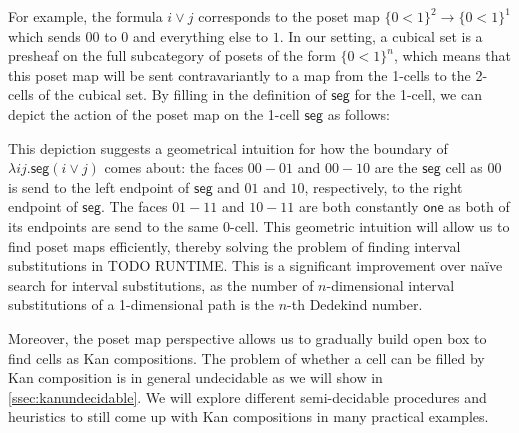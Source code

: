 \documentclass{llncs}
\newcommand{\cset}[1]{\ensuremath{\mathsf{{#1}}}}
\begin{document}
For example, the formula $i \vee j$ corresponds to the poset map $\{ 0<1 \}^2
\to \{ 0<1 \}^1$ which sends $00$ to $0$ and everything else to $1$. In our
setting, a cubical set
is a presheaf on the full subcategory of posets of the form $\{ 0<1 \}^n$, which
means that this poset map will be sent contravariantly to a map from the 1-cells
to the 2-cells of the cubical set. By filling in the definition of \cset{seg}
for the 1-cell, we can depict the action of the poset map on the 1-cell
\cset{seg} as follows:
\begin{center}
\end{center}

This depiction suggests a geometrical intuition for how the boundary of $\lambda i
j.\cset{seg} (i \vee j)$ comes about: the faces $00-01$ and $00-10$ are the
\cset{seg} cell as $00$ is send to the left endpoint of \cset{seg} and $01$ and
$10$, respectively, to the right endpoint of \cset{seg}. The faces $01-11$ and $10-11$
are both constantly \cset{one} as both of its endpoints are send to the same
0-cell. This geometric intuition will allow us to find poset maps
efficiently, thereby solving the problem of finding interval substitutions in
TODO RUNTIME. This is a significant improvement over na\"ive search for
interval substitutions, as the number of $n$-dimensional interval substitutions of a
1-dimensional path is the $n$-th Dedekind number.

Moreover, the poset map perspective allows us to gradually build open box to
find cells as Kan compositions. The problem of whether a cell can be filled by
Kan composition is in general undecidable as we will show in
\autoref{ssec:kanundecidable}. We will explore different semi-decidable
procedures and heuristics to still come up with Kan compositions in many
practical examples.
\end{document}
